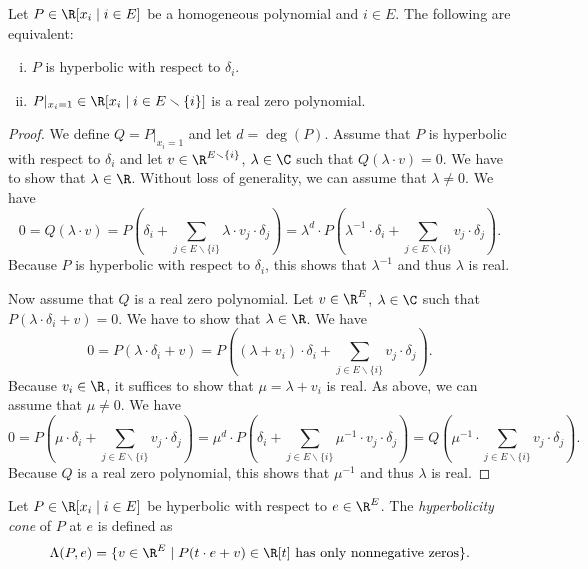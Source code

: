 \begin{lem}
    Let $P\in\R[x_i\mid i\in E]$ be a homogeneous polynomial and $i\in E$. The following are equivalent:
    \begin{enumerate}[(i)]
        \item $P$ is hyperbolic with respect to $\delta_i$.
        \item $P|_{x_i=1}\in\R[x_i\mid i\in E\smallsetminus\{i\}]$ is a real zero polynomial.
    \end{enumerate}
\end{lem}

\begin{proof}
    We define $Q=P|_{x_i=1}$ and let $d=\deg(P)$.
    Assume that $P$ is hyperbolic with respect to $\delta_i$ and let $v\in\R^{E\smallsetminus\{i\}}$, $\lambda\in\C$ such that $Q(\lambda\cdot v)=0$. We have to show that $\lambda\in\R$. Without loss of generality, we can assume that $\lambda\neq0$. We have
    \begin{equation*}
        0=Q(\lambda\cdot v)=P(\delta_i+\sum_{j\in E\smallsetminus\{i\}}\lambda\cdot v_j\cdot \delta_j)=\lambda^d\cdot P(\lambda^{-1}\cdot\delta_i+\sum_{j\in E\smallsetminus\{i\}}v_j\cdot \delta_j).
    \end{equation*}
    Because $P$ is hyperbolic with respect to $\delta_i$, this shows that $\lambda^{-1}$ and thus $\lambda$ is real.

    Now assume that $Q$ is a real zero polynomial. Let $v\in\R^E$, $\lambda\in\C$ such that $P(\lambda\cdot \delta_i+v)=0$. We have to show that $\lambda\in\R$. We have
    \begin{equation*}
        0=P(\lambda\cdot \delta_i+v)=P((\lambda+v_i)\cdot\delta_i+\sum_{j\in E\smallsetminus\{i\}} v_j\cdot \delta_j).
    \end{equation*}
    Because $v_i\in\R$, it suffices to show that $\mu=\lambda+v_i$ is real. As above, we can assume that $\mu\neq0$. We have
    \begin{equation*}
        0=P(\mu\cdot\delta_i+\sum_{j\in E\smallsetminus\{i\}} v_j\cdot \delta_j)=\mu^{d}\cdot P(\delta_i+\sum_{j\in E\smallsetminus\{i\}} \mu^{-1}\cdot v_j\cdot \delta_j)=Q(\mu^{-1}\cdot\sum_{j\in E\smallsetminus\{i\}} v_j\cdot \delta_j).
    \end{equation*}
    Because $Q$ is a real zero polynomial, this shows that $\mu^{-1}$ and thus $\lambda$ is real.
\end{proof}

\begin{Def}
    Let $P\in\R[x_i\mid i\in E]$ be hyperbolic with respect to $e\in\R^E$. The \emph{hyperbolicity cone} of $P$ at $e$ is defined as
    \begin{equation*}
        \Lambda(P,e)=\{v\in\R^E\mid P(t\cdot e+v)\in\R[t]\textrm{ has only nonnegative zeros}\}.
    \end{equation*}
\end{Def}

